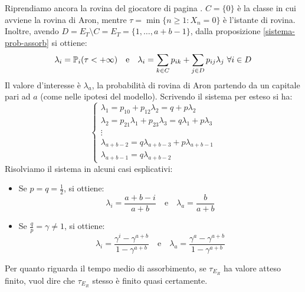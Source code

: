 \begin{ese}
	Riprendiamo ancora la rovina del giocatore di pagina \pageref{rovina-gioc}.
	$C = \{0\}$ è la classe in cui avviene la rovina di Aron, mentre
	$\tau = \min\{n \ge 1 : X_n = 0 \}$ è l'istante di rovina.
	Inoltre, avendo $D = E_T \setminus C = E_T = \{1,\dots,a+b-1\}$, dalla proposizione \ref{sistema-prob-assorb} si ottiene:
	$$\lambda_i = \mathbb P_i(\tau < +\infty) \quad \text{e} \quad
	\lambda_i = \sum_{k \in C} p_{ik} + \sum_{j \in D} p_{ij} \lambda_j \ \forall i \in D$$
	Il valore d'interesse è $\lambda_a$, la probabilità di rovina di Aron partendo da un capitale pari ad $a$ (come nelle ipotesi del modello).
	Scrivendo il sistema per esteso si ha:
	$$\begin{cases}
	\lambda_1 = p_{10} + p_{12} \lambda_2 = q + p \lambda_2 \\
	\lambda_2 = p_{21} \lambda_1 + p_{23} \lambda_3 = q \lambda_1 + p \lambda_3 \\
	\vdots \\
	\lambda_{a+b-2} = q \lambda_{a+b-3} + p \lambda_{a+b-1} \\
	\lambda_{a+b-1} = q \lambda_{a+b-2}
	\end{cases}$$
	Risolviamo il sistema in alcuni casi esplicativi:
	\begin{itemize}
		\item Se $p=q=\frac 1 2$, si ottiene:
			$$\lambda_i= \frac{a+b-i}{a+b} \quad \text{e} \quad \lambda_a = \frac{b}{a+b}$$
		\item Se $\frac q p = \gamma \neq 1$, si ottiene:
			$$\lambda_i = \frac{\gamma^i-\gamma^{a+b}}{1-\gamma^{a+b}} \quad \text{e} \quad \lambda_a = \frac{\gamma^a - \gamma^{a+b}}{1-\gamma^{a+b}}$$
	\end{itemize}
	Per quanto riguarda il tempo medio di assorbimento, se $\tau_{E_R}$ ha valore atteso finito, vuol dire che $\tau_{E_R}$ stesso è finito quasi certamente. \\

\end{ese}
